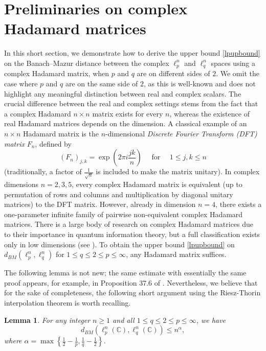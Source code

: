 \documentclass[12pt, a4paper]{article}
\theoremstyle{plain} %
\newtheorem{lemma}[theorem]{Lemma}       %
\theoremstyle{definition} %
\theoremstyle{remark} %
\begin{document}
\section{Preliminaries on complex Hadamard matrices}
\label{sechadamard}

In this short section, we demonstrate how to derive the upper bound \eqref{lpupbound} on the Banach--Mazur distance between the complex $\ell_p^n$ and $\ell_q^n$ spaces using a complex Hadamard matrix, when $p$ and $q$ are on different sides of $2$. We omit the case where $p$ and $q$ are on the same side of $2$, as this is well-known and does not highlight any meaningful distinction between real and complex scalars. The crucial difference between the real and complex settings stems from the fact that a complex Hadamard $n \times n$ matrix exists for every $n$, whereas the existence of real Hadamard matrices depends on the dimension. A classical example of an $n \times n$ Hadamard matrix is the $n$-dimensional \emph{Discrete Fourier Transform (DFT) matrix} $F_n$, defined by
$$(F_n)_{j,k} = \exp\left(2\pi i \frac{jk}{n}\right) \quad \text{ for } \quad 1 \leq j,k \leq n$$
(traditionally, a factor of $\frac{1}{\sqrt{n}}$ is included to make the matrix unitary). In complex dimensions $n=2,3,5$, every complex Hadamard matrix is equivalent (up to permutation of rows and columns and multiplication by diagonal unitary matrices) to the DFT matrix. However, already in dimension $n=4$, there exists a one-parameter infinite family of pairwise non-equivalent complex Hadamard matrices. There is a large body of research on complex Hadamard matrices due to their importance in quantum information theory, but a full classification exists only in low dimensions (see \cite{tadej}). To obtain the upper bound \eqref{lpupbound} on $d_{BM}(\ell_p^n, \ell_q^n)$ for $1 \leq q \leq 2 \leq p \leq \infty$, any Hadamard matrix suffices.

The following lemma is not new; the same estimate with essentially the same proof appears, for example, in Proposition 37.6 of \cite{ntj}. Nevertheless, we believe that for the sake of completeness,  the following short argument using the Riesz-Thorin interpolation theorem is worth recalling.

\begin{lemma}
\label{lem:lpdist}
For any integer $n \geq 1$ and all $1 \leq q \leq 2 \leq p \leq \infty$, we have
\[
d_{BM}(\ell_p^n(\mathbb{C}), \ell_q^n(\mathbb{C})) \leq n^{\alpha},
\]
where $\alpha = \max \left\{ \frac{1}{2} - \frac{1}{p}, \frac{1}{q} - \frac{1}{2} \right\}$.
\end{lemma}
\end{document}
